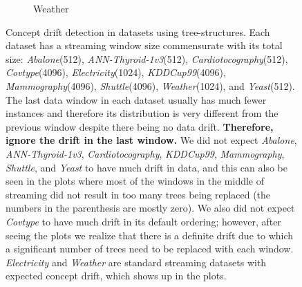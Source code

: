 \documentclass{article} %
\begin{document}
\begin{figure}
\begin{subfigure}[b]{0.23\textwidth}
      \caption{Weather}
      \label{fig:concept_drift_weather}
    \end{subfigure}
	\caption{Concept drift detection in datasets using tree-structures. Each dataset has a streaming window size commensurate with its total size: \textit{Abalone}(512), \textit{ANN-Thyroid-1v3}(512), \textit{Cardiotocography}(512), \textit{Covtype}(4096), \textit{Electricity}(1024), \textit{KDDCup99}(4096), \textit{Mammography}(4096), \textit{Shuttle}(4096), \textit{Weather}(1024), and \textit{Yeast}(512). The last data window in each dataset usually has much fewer instances and therefore its distribution is very different from the previous window despite there being no data drift. \textbf{Therefore, ignore the drift in the last window.} We did not expect \textit{Abalone}, \textit{ANN-Thyroid-1v3}, \textit{Cardiotocography}, \textit{KDDCup99}, \textit{Mammography}, \textit{Shuttle}, and \textit{Yeast} to have much drift in data, and this can also be seen in the plots where most of the windows in the middle of streaming did not result in too many trees being replaced (the numbers in the parenthesis are mostly zero). We also did not expect \textit{Covtype} to have much drift in its default ordering; however, after seeing the plots we realize that there is a definite drift due to which a significant number of trees need to be replaced with each window. \textit{Electricity} and \textit{Weather} are standard streaming datasets with expected concept drift, which shows up in the plots.} \label{fig:concept_drift}
\end{figure}

\end{document}
